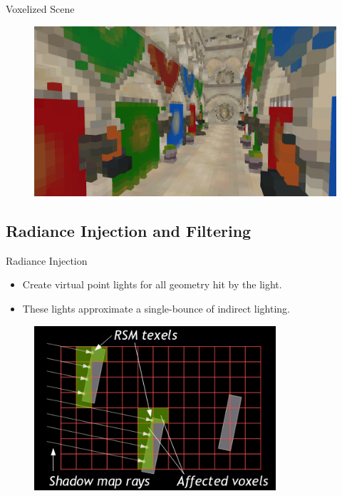 \documentclass[10pt]{beamer}
\begin{document}
\begin{frame}{Voxelized Scene}
  \begin{figure}
    \includegraphics[width=\textwidth]{voxels_msaa}
  \end{figure}
\end{frame}

\subsection{Radiance Injection and Filtering}
\begin{frame}{Radiance Injection}
  \begin{itemize}
    \item Create virtual point lights for all geometry hit by the light.
    \item These lights approximate a single-bounce of indirect lighting.
  \end{itemize}

  \begin{figure}
    \includegraphics[width=0.8\textwidth]{lightinjection}
  \end{figure}
\end{frame}
\end{document}

